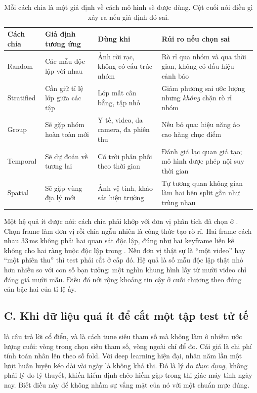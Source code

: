\documentclass[../../deep_learning.tex]{subfiles}
\begin{document}
\begin{table}[H]\centering\footnotesize
\caption{Mỗi cách chia là một giả định về cách mô hình sẽ được dùng. Cột cuối nói điều gì xảy ra nếu giả định đó sai.}
\label{tab:cach-chia}
\begin{tabularx}{\linewidth}{@{}L{2.1cm}YYL{3.9cm}@{}}
\toprule
\textbf{Cách chia} & \textbf{Giả định tương ứng} & \textbf{Dùng khi} & \textbf{Rủi ro nếu chọn sai}\\
\midrule
Random & Các mẫu độc lập với nhau & Ảnh rời rạc, không có cấu trúc nhóm & Rò rỉ qua nhóm và qua thời gian, không có dấu hiệu cảnh báo\\
Stratified & Cần giữ tỉ lệ lớp giữa các tập & Lớp mất cân bằng, tập nhỏ & Giảm phương sai ước lượng nhưng \emph{không} chặn rò rỉ nhóm\\
Group & Sẽ gặp nhóm hoàn toàn mới & Y tế, video, đa camera, đa phiên thu & Nếu bỏ qua: hiệu năng ảo cao hàng chục điểm\\
Temporal & Sẽ dự đoán về tương lai & Có trôi phân phối theo thời gian & Đánh giá lạc quan giả tạo; mô hình được phép nội suy thời gian\\
Spatial & Sẽ gặp vùng địa lý mới & Ảnh vệ tinh, khảo sát hiện trường & Tự tương quan không gian làm hai bên split gần như trùng nhau\\
\bottomrule
\end{tabularx}
\end{table}

Một hệ quả ít được nói: cách chia phải khớp với đơn vị phân tích đã chọn ở . Chọn frame làm đơn vị rồi chia ngẫu nhiên là công thức tạo rò rỉ. Hai frame cách nhau 33\,ms không phải hai quan sát độc lập, đúng như hai keyframe liền kề không cho hai ràng buộc độc lập trong . Nếu đơn vị thật sự là ``một video'' hay ``một phiên thu'' thì test phải cắt ở cấp đó. Hệ quả là số mẫu độc lập thật nhỏ hơn nhiều so với con số bạn tưởng: một nghìn khung hình lấy từ mười video chỉ đáng giá mười mẫu. Điều đó nới rộng khoảng tin cậy ở cuối chương theo đúng căn bậc hai của tỉ lệ ấy.

\subsection{C. Khi dữ liệu quá ít để cắt một tập test tử tế}
 là câu trả lời cổ điển, và  là cách tune siêu tham số mà không làm ô nhiễm ước lượng cuối: vòng trong chọn siêu tham số, vòng ngoài chỉ để đo. Cái giá là chi phí tính toán nhân lên theo số fold. Với deep learning hiện đại, nhân năm lần một lượt huấn luyện kéo dài vài ngày là không khả thi. Đó là lý do \emph{thực dụng}, không phải lý do lý thuyết, khiến kiểm định chéo hiếm gặp trong thị giác máy tính ngày nay. Biết điều này để không nhầm sự vắng mặt của nó với một chuẩn mực đúng.
\end{document}
